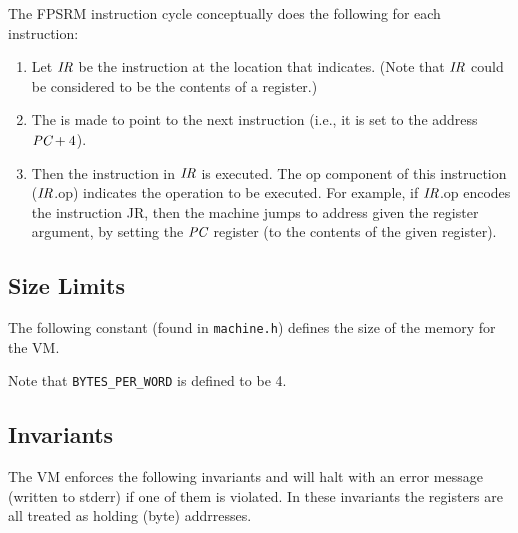 \documentclass[11pt,letterpaper]{article}
\newcommand{\LSTCFILESLICE}[2]{

}
\begin{document}
The FPSRM instruction cycle conceptually does the following for each
instruction:

\begin{enumerate}
\item
  Let $\textit{IR}$ be the instruction at the location that {\PC} indicates.
  (Note that $\textit{IR}$ could be considered to be the contents of a register.)

\item
  The {\PC} is made to point to the next instruction
  (i.e., it is set to the address $\textit{PC} + 4$).

\item
  Then the instruction in $\textit{IR}$ is executed.
  The op component of this instruction ($\textit{IR}$.op) indicates the operation
  to be executed.
  For example, if $\textit{IR}$.op encodes the instruction JR,
  then the machine jumps to address given the register argument, by
  setting the $\textit{PC}$ register (to the contents of the given register).
\end{enumerate}

\subsection{Size Limits}

The following constant (found in \texttt{machine.h}) defines the size of the memory for the VM.

\LSTCFILESLICE{10-10}{machine.h}

Note that \lstinline!BYTES_PER_WORD! is defined to be 4.

\subsection{Invariants}

The VM enforces the following invariants and will halt with an error
message (written to stderr) if one of them is violated. In these
invariants the registers are all treated as holding (byte) addrresses.
\end{document}
